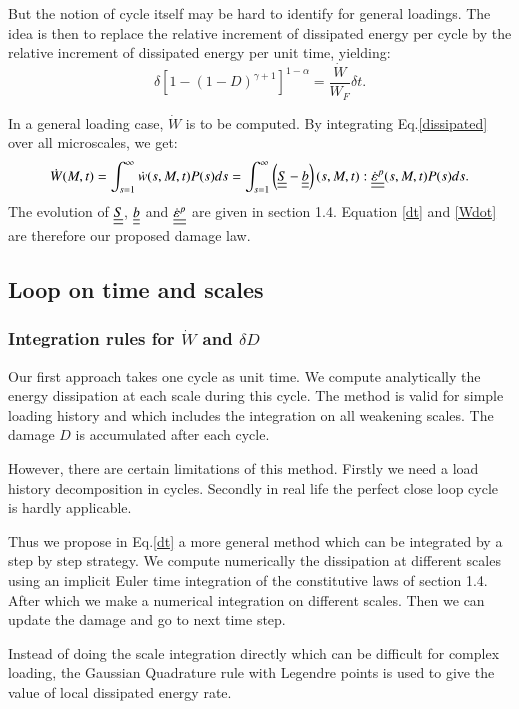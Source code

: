\documentclass[3p,times,procedia,number]{elsarticle}
\begin{document}
But the notion of cycle itself may be hard to identify for general loadings. The idea is then to replace the relative increment of dissipated energy per cycle by the relative increment of dissipated energy per unit time, yielding:
\begin{equation}
	\delta [1-(1-D)^{\gamma+1}]^{1-\alpha}=\dfrac{\dot{W}}{W_F}\delta t.
	\label{dt}
\end{equation}

In a general loading case, $\dot{W}$ is to be computed. By integrating Eq.\eqref{dissipated} over all microscales, we get:
\begin{equation}\dot{W}(M,t)=\int_{s=1}^{\infty}\dot{w}(s,M,t)P(s)ds=\int_{s=1}^{\infty}\left(\uline{\uline{S}}-\uline{\uline{b}} \right) (s,M,t):\uline{\uline{\dot{\varepsilon}^p}}(s,M,t)P(s)ds.\label{Wdot}
\end{equation}
The evolution of $\uline{\uline{S}}$, $\uline{\uline{b}}$ and $\uline{\uline{\dot{\varepsilon}^p}}$ are given in section 1.4. Equation \eqref{dt} and \eqref{Wdot} are therefore our proposed damage law.

\subsection{Loop on time and scales}
\subsubsection{Integration rules for $\dot{W}$ and $\delta D$}
Our first approach takes one cycle as unit time. We compute analytically the energy dissipation at each scale during this cycle. The method is valid for simple loading history and which includes the integration on all weakening scales. The damage $D$ is accumulated after each cycle.

However, there are certain limitations of this method. Firstly we need a load history decomposition in cycles. Secondly in real life the perfect close loop cycle is hardly applicable.

Thus we propose in Eq.\eqref{dt} a more general method which can be integrated by a step by step strategy. We compute numerically the dissipation at different scales using an implicit Euler time integration of the constitutive laws of section 1.4. After which we make a numerical integration on different scales. Then we can update the damage and go to next time step. 

Instead of doing the scale integration directly which can be difficult for complex loading, the Gaussian Quadrature rule with Legendre points is used to give the value of local dissipated energy rate.
\end{document}
